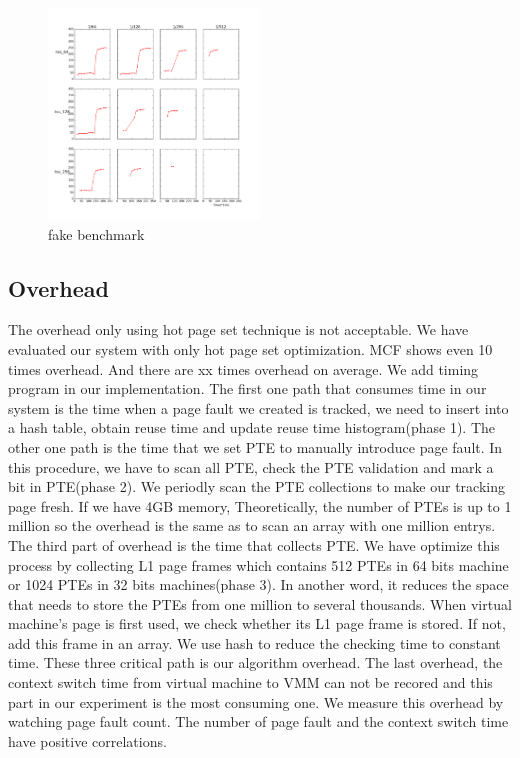 \documentclass[10pt,twocolumn]{article}
\begin{document}
\begin{figure}[!htp]
	\caption{fake benchmark}
	\label{fig7}
	\includegraphics[width=0.5\textwidth]{img/sampling_exp/sampling_exp_milc.png}
\end{figure} 

\subsection{Overhead}
The overhead only using hot page set technique is not acceptable. We have evaluated our system with only hot page set optimization. MCF shows even 10 times overhead. And there are xx times overhead on average. We add timing program in our implementation. The first one path that consumes time in our system is the time when a page fault we created is tracked, we need to insert into a hash table, obtain reuse time and update reuse time histogram(phase 1). The other one path is the time that we set PTE to manually introduce page fault. In this procedure, we have to scan all PTE, check the PTE validation and mark a bit in PTE(phase 2). We periodly scan the PTE collections to make our tracking page fresh. If we have 4GB memory, Theoretically, the number of PTEs is up to 1 million so the overhead is the same as to scan an array with one million entrys. The third part of overhead is the time that collects PTE. We have optimize this process by collecting L1 page frames which contains 512 PTEs in 64 bits machine or 1024 PTEs in 32 bits machines(phase 3). In another word, it reduces the space that needs to store the PTEs from one million to several thousands. When virtual machine's page is first used, we check whether its L1 page frame is stored. If not, add this frame in an array. We use hash to reduce the checking time to constant time. These three critical path is our algorithm overhead. The last overhead, the context switch time from virtual machine to VMM can not be recored and this part in our experiment is the most consuming one. We measure this overhead by watching page fault count. The number of page fault and the context switch time have positive correlations.
\end{document}
